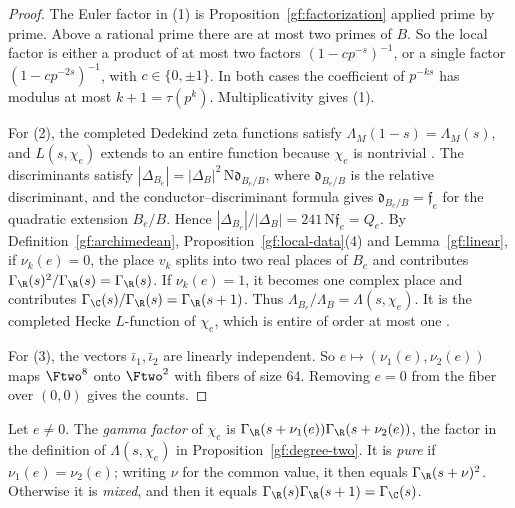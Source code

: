 \begin{proof}
The Euler factor in (1) is Proposition~\ref{gf:factorization} applied prime
by prime. Above a rational prime there are at most two primes of $B$. So
the local factor is either a product of at most two factors
$(1-cp^{-s})^{-1}$, or a single factor $(1-cp^{-2s})^{-1}$, with
$c\in\{0,\pm1\}$. In both cases the coefficient of $p^{-ks}$ has modulus at
most $k+1=\tau(p^k)$. Multiplicativity gives (1).

For (2), the completed Dedekind zeta functions satisfy
$\Lambda_M(1-s)=\Lambda_M(s)$, and $L(s,\chi_e)$ extends to an entire
function because $\chi_e$ is nontrivial \cite{Hecke1920,Tate1967}. The
discriminants satisfy
$|\Delta_{B_e}|=|\Delta_B|^2\,\mathrm N\mathfrak d_{B_e/B}$, where
$\mathfrak d_{B_e/B}$ is the relative discriminant, and the
conductor--discriminant formula gives $\mathfrak d_{B_e/B}=\mathfrak f_e$
for the quadratic extension $B_e/B$. Hence
$|\Delta_{B_e}|/|\Delta_B|=241\,\mathrm N\mathfrak f_e=Q_e$. By
Definition~\ref{gf:archimedean}, Proposition~\ref{gf:local-data}(4) and
Lemma~\ref{gf:linear}, if
$\nu_k(e)=0$, the place $v_k$ splits into two real places of $B_e$ and contributes
$\Gamma_\R(s)^2/\Gamma_\R(s)=\Gamma_\R(s)$. If $\nu_k(e)=1$, it becomes one
complex place and contributes $\Gamma_\C(s)/\Gamma_\R(s)=\Gamma_\R(s+1)$.
Thus $\Lambda_{B_e}/\Lambda_B=\Lambda(s,\chi_e)$. It is the completed Hecke
$L$-function of $\chi_e$, which is entire of order at most one
\cite{Hecke1920,Tate1967}.

For (3), the vectors $\bar\iota_1,\bar\iota_2$ are linearly independent. So
$e\mapsto(\nu_1(e),\nu_2(e))$ maps $\Ftwo^8$ onto $\Ftwo^2$ with fibers of
size $64$. Removing $e=0$ from the fiber over $(0,0)$ gives the counts.
\end{proof}

\begin{definition}\label{gf:pure-mixed}
Let $e\ne0$. The \emph{gamma factor} of $\chi_e$ is
$\Gamma_\R(s+\nu_1(e))\Gamma_\R(s+\nu_2(e))$, the factor in the definition of
$\Lambda(s,\chi_e)$ in Proposition~\ref{gf:degree-two}. It is \emph{pure} if
$\nu_1(e)=\nu_2(e)$; writing $\nu$ for the common value, it then equals
$\Gamma_\R(s+\nu)^2$. Otherwise it is \emph{mixed}, and then it equals
$\Gamma_\R(s)\Gamma_\R(s+1)=\Gamma_\C(s)$.
\end{definition}

